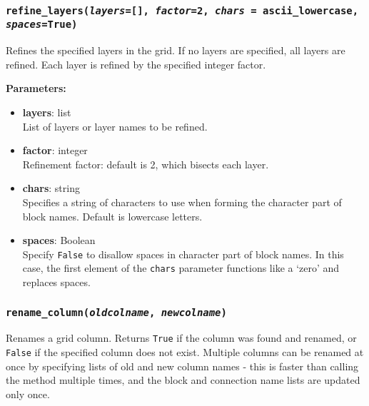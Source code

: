 \begin{snugshade}
\subsubsection{\texttt{refine\_layers(\emph{layers}=[], \emph{factor}=2, \emph{chars} = ascii\_lowercase, \emph{spaces}=\texttt{True})}}\end{snugshade}
\label{sec:mulgrid:refine_layers}

Refines the specified layers in the grid.  If no layers are specified, all layers are refined.  Each layer is refined by the specified integer factor.

\textbf{Parameters:}
\begin{itemize}
  \item \textbf{layers}: list\\
    List of layers or layer names to be refined.
  \item \textbf{factor}: integer\\
    Refinement factor: default is 2, which bisects each layer.
  \item \textbf{chars}: string\\
    Specifies a string of characters to use when forming the character part of block names.  Default is lowercase letters.
\item \textbf{spaces}: Boolean\\
  Specify \texttt{False} to disallow spaces in character part of block names. In this case, the first element of the \texttt{chars} parameter functions like a `zero' and replaces spaces.
\end{itemize}

\begin{snugshade}\subsubsection{\texttt{rename\_column(\emph{oldcolname}, \emph{newcolname})}}\end{snugshade}
\label{sec:mulgrid:rename_column}

Renames a grid column.  Returns \texttt{True} if the column was found and renamed, or \texttt{False} if the specified column does not exist.  Multiple columns can be renamed at once by specifying lists of old and new column names - this is faster than calling the method multiple times, and the block and connection name lists are updated only once.

